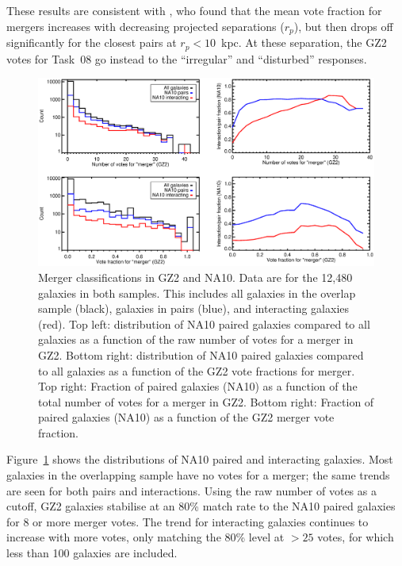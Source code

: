 \documentclass[useAMS,usenatbib]{mn2e}
\begin{document}
These results are consistent with \citet{cas13}, who found that the mean vote fraction for mergers increases with decreasing projected separations ($r_p$), but then drops off significantly for the closest pairs at $r_p < 10$~kpc. At these separation, the GZ2 votes for Task~08 go instead to the ``irregular'' and ``disturbed'' responses. 

\begin{figure}
\includegraphics[angle=0,width=7.0in]{figures/na_pairs.eps}
\caption{Merger classifications in GZ2 and NA10. Data are for the 12,480 galaxies in both samples. This includes all galaxies in the overlap sample (black), galaxies in pairs (blue), and interacting galaxies (red). Top left: distribution of NA10 paired galaxies compared to all galaxies as a function of the raw number of votes for a merger in GZ2. Bottom right: distribution of NA10 paired galaxies compared to all galaxies as a function of the GZ2 vote fractions for merger. Top right: Fraction of paired galaxies (NA10) as a function of the total number of votes for a merger in GZ2. Bottom right: Fraction of paired galaxies (NA10) as a function of the GZ2 merger vote fraction. 
\label{fig-na_pairs}}
\end{figure}

Figure~\ref{fig-na_pairs} shows the distributions of NA10 paired and interacting galaxies. Most galaxies in the overlapping sample have no votes for a merger; the same trends are seen for both pairs and interactions. Using the raw number of votes as a cutoff, GZ2 galaxies stabilise at an 80\% match rate to the NA10 paired galaxies for 8 or more merger votes. The trend for interacting galaxies continues to increase with more votes, only matching the 80\% level at $>25$ votes, for which less than 100 galaxies are included.
\end{document}
